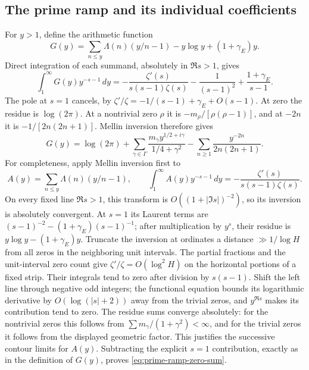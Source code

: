 \subsection{The prime ramp and its individual coefficients}
For $y>1$, define the arithmetic function
\[
 G(y)=\sum_{n\le y}\Lambda(n)(y/n-1)-y\log y+(1+\gamma_E)y.
\]
Direct integration of each summand, absolutely in $\Re s>1$,
gives
\begin{equation}\label{eq:prime-ramp-mellin}
 \int_1^\infty G(y)y^{-s-1}\,dy
 =-\frac{\zeta'(s)}{s(s-1)\zeta(s)}
       -\frac1{(s-1)^2}+\frac{1+\gamma_E}{s-1}.
\end{equation}
The pole at $s=1$ cancels, by
$\zeta'/\zeta=-1/(s-1)+\gamma_E+O(s-1)$.
At zero the residue is $\log(2\pi)$. At a nontrivial zero
$\rho$ it is $-m_\rho/[\rho(\rho-1)]$, and at $-2n$ it is
$-1/[2n(2n+1)]$. Mellin inversion therefore gives
\begin{equation}\label{eq:prime-ramp-zero-sum}
 G(y)=\log(2\pi)
  +\sum_{\gamma\in\Gamma}
       \frac{m_\gamma y^{1/2+i\gamma}}{1/4+\gamma^2}
  -\sum_{n\ge1}\frac{y^{-2n}}{2n(2n+1)}.
\end{equation}
For completeness, apply Mellin inversion first to
\[
 A(y)=\sum_{n\le y}\Lambda(n)(y/n-1),\qquad
 \int_1^\infty A(y)y^{-s-1}\,dy
       =-\frac{\zeta'(s)}{s(s-1)\zeta(s)}.
\]
On every fixed line $\Re s>1$, this transform is
$O((1+|\Im s|)^{-2})$, so its inversion is absolutely convergent.
At $s=1$ its Laurent terms are
$(s-1)^{-2}-(1+\gamma_E)(s-1)^{-1}$; after multiplication
by $y^s$, their residue is
$y\log y-(1+\gamma_E)y$.
Truncate the inversion at ordinates a distance
$\gg1/\log H$ from all zeros in the neighboring unit intervals.
The partial fractions and the unit-interval zero count give
$\zeta'/\zeta=O(\log^2H)$ on the horizontal portions of a fixed
strip. Their integrals tend to zero after division by $s(s-1)$.
Shift the left line through negative odd integers; the functional
equation bounds its logarithmic derivative by
$O(\log(|s|+2))$ away from the trivial zeros, and $y^{\Re s}$
makes its contribution tend to zero. The residue sums converge
absolutely: for the nontrivial zeros this follows from
$\sum m_\gamma/(1+\gamma^2)<\infty$, and for the trivial zeros
it follows from the displayed geometric factor. This justifies
the successive contour limits for $A(y)$. Subtracting the
explicit $s=1$ contribution, exactly as in the definition of
$G(y)$, proves \eqref{eq:prime-ramp-zero-sum}.

